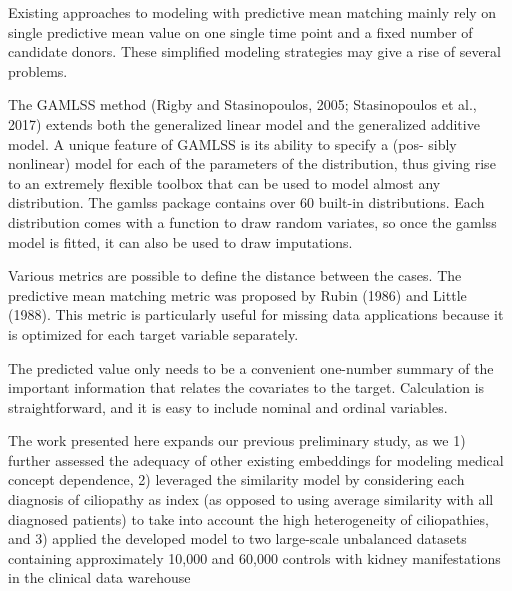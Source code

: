 \documentclass{article}
\begin{document}
Existing approaches to modeling with predictive mean matching mainly
rely on single predictive mean value on one single time point and a
fixed number of candidate donors. These simplified modeling strategies
may give a rise of several problems.

The GAMLSS method (Rigby and Stasinopoulos, 2005; Stasinopoulos et al.,
2017) extends both the generalized linear model and the generalized
additive model. A unique feature of GAMLSS is its ability to specify a
(pos- sibly nonlinear) model for each of the parameters of the
distribution, thus giving rise to an extremely flexible toolbox that can
be used to model almost any distribution. The gamlss package contains
over 60 built-in distributions. Each distribution comes with a function
to draw random variates, so once the gamlss model is fitted, it can also
be used to draw imputations.

Various metrics are possible to define the distance between the cases.
The predictive mean matching metric was proposed by Rubin (1986) and
Little (1988). This metric is particularly useful for missing data
applications because it is optimized for each target variable
separately.

The predicted value only needs to be a convenient one-number summary of
the important information that relates the covariates to the target.
Calculation is straightforward, and it is easy to include nominal and
ordinal variables.

The work presented here expands our previous preliminary study, as we 1)
further assessed the adequacy of other existing embeddings for modeling
medical concept dependence, 2) leveraged the similarity model by
considering each diagnosis of ciliopathy as index (as opposed to using
average similarity with all diagnosed patients) to take into account the
high heterogeneity of ciliopathies, and 3) applied the developed model
to two large-scale unbalanced datasets containing approximately 10,000
and 60,000 controls with kidney manifestations in the clinical data
warehouse
\end{document}
